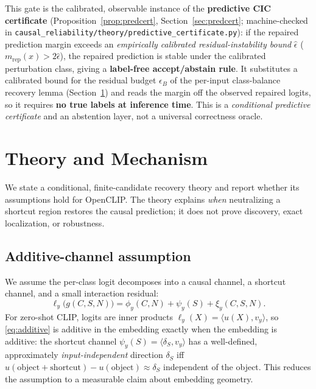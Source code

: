 \documentclass[11pt]{article}
\begin{document}
This gate is the calibrated, observable instance of the \textbf{predictive CIC
certificate} (Proposition~\ref{prop:predcert}, Section~\ref{sec:predcert};
machine-checked in
\texttt{causal\_reliability/theory/predictive\_certificate.py}): if the repaired
prediction margin exceeds an \emph{empirically calibrated residual-instability bound}
$\hat\epsilon$ ($m_{\mathrm{rep}}(x) > 2\hat\epsilon$), the repaired prediction is
stable under the calibrated perturbation class, giving a \textbf{label-free
accept/abstain rule}. It substitutes a calibrated bound for the residual budget
$\epsilon_B$ of the per-input class-balance recovery lemma
(Section~\ref{sec:theory}) and reads the margin off the observed repaired logits, so
it requires \textbf{no true labels at inference time}. This is a
\emph{conditional predictive certificate} and an abstention layer, not a universal
correctness oracle.

\section{Theory and Mechanism}\label{sec:theory}
We state a conditional, finite-candidate recovery theory and report whether its
assumptions hold for OpenCLIP. The theory explains \emph{when} neutralizing a
shortcut region restores the causal prediction; it does not prove discovery, exact
localization, or robustness.

\subsection{Additive-channel assumption}
We assume the per-class logit decomposes into a causal channel, a shortcut channel,
and a small interaction residual:
\begin{equation}\label{eq:additive}
\ell_y\big(g(C,S,N)\big) = \phi_y(C,N) + \psi_y(S) + \xi_y(C,S,N).
\end{equation}
For zero-shot CLIP, logits are inner products $\ell_y(X)=\langle u(X), v_y\rangle$,
so \eqref{eq:additive} is additive in the embedding exactly when the embedding is
additive: the shortcut channel $\psi_y(S)=\langle \delta_S, v_y\rangle$ has a
well-defined, approximately \emph{input-independent} direction $\delta_S$ iff
$u(\text{object}+\text{shortcut}) - u(\text{object}) \approx \delta_S$ independent of
the object. This reduces the assumption to a measurable claim about embedding
geometry.
\end{document}
